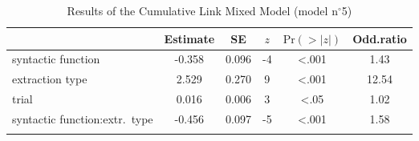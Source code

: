 \begin{table}
\begin{tabularx}{\textwidth}{Q S[table-format=-1.3] S[table-format=1.3] S[table-format=-1] S[table-format=<1.3] S[table-format=2.2]}
  \lsptoprule
 & {Estimate} & {SE} & {$z$} & {$\text{Pr}(>|z|)$} & {Odd.ratio} \\ 
  \midrule
  syntactic function & -0.358 & 0.096 & -4 & <.001 & 1.43 \\ 
  extraction type & 2.529 & 0.270 & 9 & <.001 & 12.54 \\ 
  trial & 0.016 & 0.006 & 3 & <.05 & 1.02 \\ 
  syntactic function:extr.\ type & -0.456 & 0.097 & -5 & <.001 & 1.58 \\
   \lspbottomrule
\end{tabularx}
\caption{Results of the Cumulative Link Mixed Model (model n$^{\circ}$5)}
\label{tab:exp08-m4}
\end{table}
